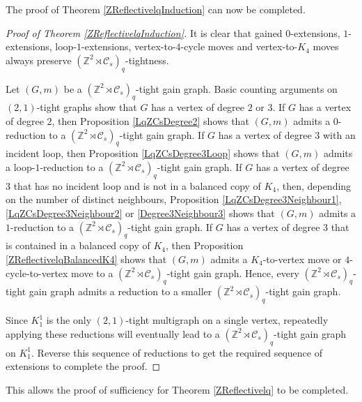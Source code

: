 \documentclass[reqno,a4paper,10pt]{article}
\theoremstyle{definition}
\theoremstyle{remark}
\numberwithin{equation}{section}
\numberwithin{figure}{section}
\numberwithin{table}{section}
\newcommand{\Z}{\mathbb{Z}}
\begin{document}
    The proof of Theorem \ref{ZReflectivelqInduction} can now be completed.
    \begin{proof}[Proof of Theorem \ref{ZReflectivelqInduction}]
        It is clear that gained $0$-extensions, $1$-extensions, loop-$1$-extensions, vertex-to-$4$-cycle moves and vertex-to-$K_4$ moves always preserve $(\Z^2\rtimes\mathcal{C}_s)_q$-tightness.
		
		Let $(G,m)$ be a $(\Z^2\rtimes\mathcal{C}_s)_q$-tight gain graph. Basic counting arguments on $(2,1)$-tight graphs show that $G$ has a vertex of degree $2$ or $3$. If $G$ has a vertex of degree $2$, then Proposition \ref{LqZCsDegree2} shows that $(G,m)$ admits a $0$-reduction to a $(\Z^2\rtimes\mathcal{C}_s)_q$-tight gain graph. If $G$ has a vertex of degree $3$ with an incident loop, then Proposition \ref{LqZCsDegree3Loop} shows that $(G,m)$ admits a loop-$1$-reduction to a $(\Z^2\rtimes\mathcal{C}_s)_q$-tight gain graph. If $G$ has a vertex of degree $3$ that has no incident loop and is not in a balanced copy of $K_4$, then, depending on the number of distinct neighbours, Proposition \ref{LqZCsDegree3Neighbour1}, \ref{LqZCsDegree3Neighbour2} or \ref{Degree3Neighbour3} shows that $(G,m)$ admits a $1$-reduction to a $(\Z^2\rtimes\mathcal{C}_s)_q$-tight gain graph. If $G$ has a vertex of degree $3$ that is contained in a balanced copy of $K_4$, then Proposition \ref{ZReflectivelqBalancedK4} shows that $(G,m)$ admits a $K_4$-to-vertex move or $4$-cycle-to-vertex move to a $(\Z^2\rtimes\mathcal{C}_s)_q$-tight gain graph. Hence, every $(\Z^2\rtimes\mathcal{C}_s)_q$-tight gain graph admits a reduction to a smaller $(\Z^2\rtimes\mathcal{C}_s)_q$-tight gain graph.
		
		Since $K_1^1$ is the only $(2,1)$-tight multigraph on a single vertex, repeatedly applying these reductions will eventually lead to a $(\Z^2\rtimes\mathcal{C}_s)_q$-tight gain graph on $K_1^1$. Reverse this sequence of reductions to get the required sequence of extensions to complete the proof.
    \end{proof}
    This allows the proof of sufficiency for Theorem \ref{ZReflectivelq} to be completed.
\end{document}

